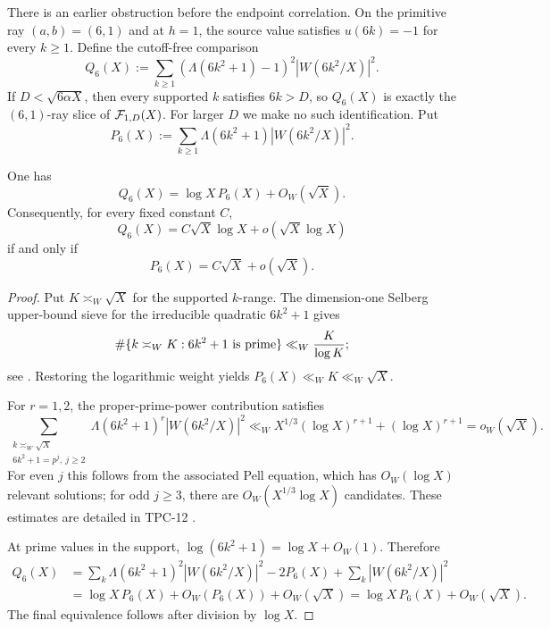 There is an earlier obstruction before the endpoint correlation.  On
the primitive ray $(a,b)=(6,1)$ and at $h=1$, the source value satisfies
$u(6k)=-1$ for every $k\geq1$.  Define the cutoff-free comparison
\begin{equation}
 Q_6(X):=
 \sum_{k\geq1}(\Lambda(6k^2+1)-1)^2|W(6k^2/X)|^2.
\label{eq:quadratic-ray-energy}
\end{equation}
If $D<\sqrt{6\alpha X}$, then every supported $k$ satisfies $6k>D$, so
$Q_6(X)$ is exactly the $(6,1)$-ray slice of $\mathcal F_{1,D}(X)$.  For larger
$D$ we make no such identification.
Put
\begin{equation}
 P_6(X):=
 \sum_{k\geq1}\Lambda(6k^2+1)|W(6k^2/X)|^2.
 \label{eq:quadratic-prime-sum}
\end{equation}

\begin{proposition}
\label{prop:quadratic-prime-threshold}
One has
\begin{equation}
 Q_6(X)=\log X\,P_6(X)+O_W(\sqrt X).
 \label{eq:quadratic-ray-reduction}
\end{equation}
Consequently, for every fixed constant $C$,
\begin{equation}
 Q_6(X)=C\sqrt X\log X+o(\sqrt X\log X)
 \label{eq:quadratic-energy-asymptotic}
\end{equation}
if and only if
\begin{equation}
 P_6(X)=C\sqrt X+o(\sqrt X).
 \label{eq:quadratic-prime-asymptotic}
\end{equation}
\end{proposition}

\begin{proof}
Put $K\asymp_W\sqrt X$ for the supported $k$-range.  The
dimension-one Selberg upper-bound sieve for the irreducible quadratic
$6k^2+1$ gives
\[
 \#\{k\asymp_WK:6k^2+1\ {\rm is\ prime}\}
 \ll_W\frac K{\log K};
\]
see \citet{HalberstamRichert1974}.  Restoring the logarithmic
weight yields $P_6(X)\ll_WK\ll_W\sqrt X$.

For $r=1,2$, the proper-prime-power contribution satisfies
\[
 \sum_{\substack{k\asymp_W\sqrt X\\6k^2+1=p^j,\ j\geq2}}
 \Lambda(6k^2+1)^r|W(6k^2/X)|^2
 \ll_WX^{1/3}(\log X)^{r+1}+(\log X)^{r+1}
 =o_W(\sqrt X).
\]
For even $j$ this follows from the associated Pell equation, which has
$O_W(\log X)$ relevant solutions; for odd $j\geq3$, there are
$O_W(X^{1/3}\log X)$ candidates.  These estimates are detailed in
TPC-12 \citep{WangTPC12}.

At prime values in the support,
$\log(6k^2+1)=\log X+O_W(1)$.  Therefore
\[
 \begin{aligned}
 Q_6(X)
 &=
 \sum_k\Lambda(6k^2+1)^2|W(6k^2/X)|^2
 -2P_6(X)+\sum_k|W(6k^2/X)|^2\\
 &=\log X\,P_6(X)+O_W(P_6(X))+O_W(\sqrt X)
 =\log X\,P_6(X)+O_W(\sqrt X).
 \end{aligned}
\]
The final equivalence follows after division by $\log X$.
\end{proof}

